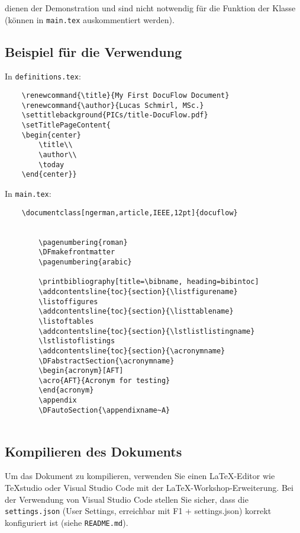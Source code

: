 dienen der Demonstration und sind nicht notwendig für die Funktion der Klasse 
(können in \verb|main.tex| auskommentiert werden).


\clearpage

\subsection{Beispiel für die Verwendung}

In \verb|definitions.tex|:

\begin{verbatim}
    \renewcommand{\title}{My First DocuFlow Document}
    \renewcommand{\author}{Lucas Schmirl, MSc.}
    \settitlebackground{PICs/title-DocuFlow.pdf}
    \setTitlePageContent{
    \begin{center}
        \title\\
        \author\\
        \today
    \end{center}}
\end{verbatim}

\noindent In \verb|main.tex|:

\begin{verbatim}
    \documentclass[ngerman,article,IEEE,12pt]{docuflow}
    
    
        \pagenumbering{roman}
        \DFmakefrontmatter
        \pagenumbering{arabic}
        
        \printbibliography[title=\bibname, heading=bibintoc]
        \addcontentsline{toc}{section}{\listfigurename}
        \listoffigures
        \addcontentsline{toc}{section}{\listtablename}
        \listoftables
        \addcontentsline{toc}{section}{\lstlistlistingname}
        \lstlistoflistings
        \addcontentsline{toc}{section}{\acronymname}
        \DFabstractSection{\acronymname}
        \begin{acronym}[AFT]
        \acro{AFT}{Acronym for testing}
        \end{acronym}
        \appendix
        \DFautoSection{\appendixname~A}
    

\end{verbatim}

\clearpage

\subsection{Kompilieren des Dokuments}\label{settingsjson}

Um das Dokument zu kompilieren, verwenden Sie einen LaTeX-Editor wie TeXstudio oder Visual Studio Code mit der LaTeX-Workshop-Erweiterung. 
Bei der Verwendung von Visual Studio Code stellen Sie sicher, dass die \verb|settings.json| (User Settings, erreichbar mit F1 + settings.json) korrekt konfiguriert ist (siehe \verb|README.md|).\\

